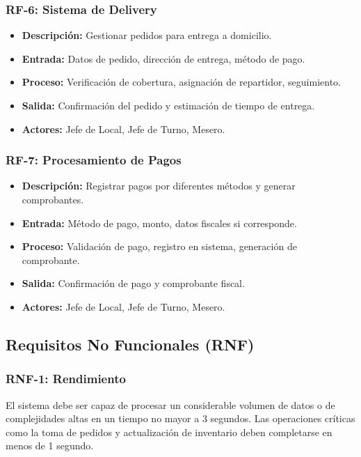 \documentclass[12pt]{article}
\begin{document}
\subsubsection{RF-6: Sistema de Delivery}
\begin{itemize}
  \item \textbf{Descripción:} Gestionar pedidos para entrega a domicilio.
  \item \textbf{Entrada:} Datos de pedido, dirección de entrega, método de pago.
  \item \textbf{Proceso:} Verificación de cobertura, asignación de repartidor, seguimiento.
  \item \textbf{Salida:} Confirmación del pedido y estimación de tiempo de entrega.
  \item \textbf{Actores:} Jefe de Local, Jefe de Turno, Mesero.
\end{itemize}

\subsubsection{RF-7: Procesamiento de Pagos}
\begin{itemize}
  \item \textbf{Descripción:} Registrar pagos por diferentes métodos y generar comprobantes.
  \item \textbf{Entrada:} Método de pago, monto, datos fiscales si corresponde.
  \item \textbf{Proceso:} Validación de pago, registro en sistema, generación de comprobante.
  \item \textbf{Salida:} Confirmación de pago y comprobante fiscal.
  \item \textbf{Actores:} Jefe de Local, Jefe de Turno, Mesero.
\end{itemize}

\subsection{Requisitos No Funcionales (RNF)}

\subsubsection{RNF-1: Rendimiento}
El sistema debe ser capaz de procesar un considerable volumen de datos o de complejidades altas en un tiempo no mayor a 3 segundos. Las operaciones críticas como la toma de pedidos y actualización de inventario deben completarse en menos de 1 segundo.
\end{document}
